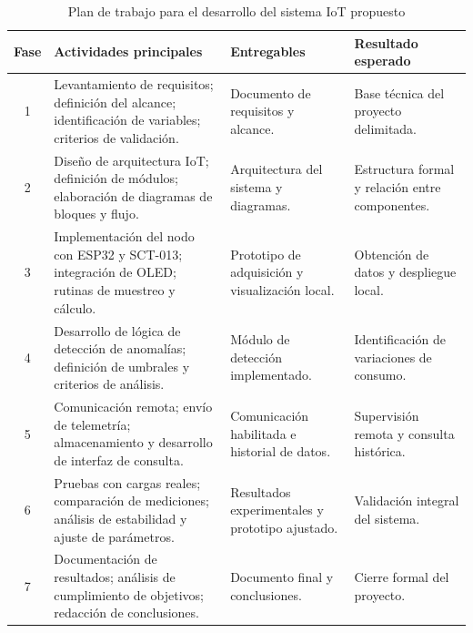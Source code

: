 ﻿\documentclass[12pt,openright,oneside]{report}
\theoremstyle{mytheoremstyle}
\theoremstyle{mytheoremstyle}
\theoremstyle{myproblemstyle}
\begin{document}
\begin{table}[H]
\centering
\small %
\caption{Plan de trabajo para el desarrollo del sistema IoT propuesto}
\label{tab:plan_trabajo}
\renewcommand{\arraystretch}{1.5} %

\begin{tabularx}{\textwidth}{|c|X|X|X|}
\hline
\rowcolor[gray]{0.9} %
\textbf{Fase} & \textbf{Actividades principales} & \textbf{Entregables} & \textbf{Resultado esperado} \\ \hline

1 & 
Levantamiento de requisitos; definición del alcance; identificación de variables; criterios de validación. & 
Documento de requisitos y alcance. & 
Base técnica del proyecto delimitada. \\ \hline

2 & 
Diseño de arquitectura IoT; definición de módulos; elaboración de diagramas de bloques y flujo. & 
Arquitectura del sistema y diagramas. & 
Estructura formal y relación entre componentes. \\ \hline

3 & 
Implementación del nodo con ESP32 y SCT-013; integración de OLED; rutinas de muestreo y cálculo. & 
Prototipo de adquisición y visualización local. & 
Obtención de datos y despliegue local. \\ \hline

4 & 
Desarrollo de lógica de detección de anomalías; definición de umbrales y criterios de análisis. & 
Módulo de detección implementado. & 
Identificación de variaciones de consumo. \\ \hline

5 & 
Comunicación remota; envío de telemetría; almacenamiento y desarrollo de interfaz de consulta. & 
Comunicación habilitada e historial de datos. & 
Supervisión remota y consulta histórica. \\ \hline

6 & 
Pruebas con cargas reales; comparación de mediciones; análisis de estabilidad y ajuste de parámetros. & 
Resultados experimentales y prototipo ajustado. & 
Validación integral del sistema. \\ \hline

7 & 
Documentación de resultados; análisis de cumplimiento de objetivos; redacción de conclusiones. & 
Documento final y conclusiones. & 
Cierre formal del proyecto. \\ \hline

\end{tabularx}
\end{table}
\end{document}
